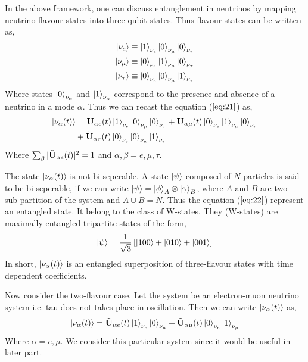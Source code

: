 \documentclass[12pt,a4paper]{report}
\begin{document}
In the above framework, one can discuss entanglement in neutrinos by mapping neutrino flavour states into three-qubit states. Thus flavour states can be written as,
\begin{equation}
\begin{split}
\ket{\nu_{e}}& \equiv \ket{1}_{\nu_{e}}\ket{0}_{\nu_{\mu}}\ket{0}_{\nu_{\tau}} \\
\ket{\nu_{\mu}}& \equiv \ket{0}_{\nu_{e}}\ket{1}_{\nu_{\mu}}\ket{0}_{\nu_{\tau}} \\
\ket{\nu_{\tau}}& \equiv \ket{0}_{\nu_{e}}\ket{0}_{\nu_{\mu}}\ket{1}_{\nu_{\tau}} \\
\end{split}
\end{equation}
Where states $\ket{0}_{\nu_{\alpha}}$ and $\ket{1}_{\nu_{\alpha}}$ correspond to the presence and absence of a neutrino in a mode $\alpha$. Thus we can recast the equation ($\ref{eq:21}$) as,
\begin{equation}
\label{eq:22}
\begin{split}
\ket{\nu_{\alpha}(t)}&=\Tilde{\textbf{U}}_{\alpha e}(t) \ket{1}_{\nu_{e}}\ket{0}_{\nu_{\mu}}\ket{0}_{\nu_{\tau}}+\Tilde{\textbf{U}}_{\alpha \mu}(t) \ket{0}_{\nu_{e}}\ket{1}_{\nu_{\mu}}\ket{0}_{\nu_{\tau}}\\
&+\Tilde{\textbf{U}}_{\alpha \tau}(t)
\ket{0}_{\nu_{e}}\ket{0}_{\nu_{\mu}}\ket{1}_{\nu_{\tau}}
\end{split}
\end{equation}
Where $\sum_{\beta}|\Tilde{\textbf{U}}_{\alpha e}(t)|^{2} = 1$ and $\alpha,\beta = e,\mu,\tau$.\par
The state $\ket{\nu_{\alpha}(t)}$ is not bi-seperable. A state $\ket{\psi}$ composed of $N$ particles is said to be bi-seperable, if we can write $\ket{\psi} = \ket{\phi}_{A}\otimes\ket{\gamma}_{B}$, where $A$ and $B$ are two sub-partition of the system and $A \cup B = N$. Thus the equation ($\ref{eq:22}$) represent an entangled state. It belong to the class of W-states. They (W-states) are maximally entangled tripartite states of the form,
\begin{equation}
\ket{\psi} = \frac{1}{\sqrt{3}}\left[ \ket{100}+\ket{010}+\ket{001}\right]
\end{equation}
In short, $\ket{\nu_{\alpha}(t)}$ is an entangled superposition of three-flavour states with time dependent coefficients.\par
Now consider the two-flavour case. Let the system be an electron-muon neutrino system i.e. tau does not takes place in oscillation. Then we can write $\ket{\nu_{\alpha}(t)}$ as,
\begin{equation}
\label{eq:23}
\ket{\nu_{\alpha}(t)}=\Tilde{\textbf{U}}_{\alpha e}(t) \ket{1}_{\nu_{e}}\ket{0}_{\nu_{\mu}}+\Tilde{\textbf{U}}_{\alpha \mu}(t) \ket{0}_{\nu_{e}}\ket{1}_{\nu_{\mu}}
\end{equation}
Where $\alpha=e,\mu$. We consider this particular system since it would be useful in later part.
\end{document}
